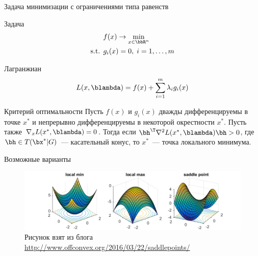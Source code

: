 \documentclass[12pt]{beamer}
\begin{document}
\begin{frame}{{\small Задача минимизации с ограничениями типа равенств}}

\begin{block}{Задача}
\vspace{-3mm}
\begin{equation*}
\begin{split}
& f(x) \rightarrow \min\limits_{x \in \bbR^n} \\
\text{s.t. } & g_i(x) = 0, \; i = 1,\ldots, m 
\end{split}
\end{equation*}
\end{block}

\begin{block}{Лагранжиан}
\vspace{-2mm}
\begin{equation*}
L(x, \blambda) = f(x) + \sum\limits_{i=1}^m\lambda_i g_i(x)
\end{equation*}
\end{block}

\begin{block}{Критерий оптимальности}
Пусть $f(x)$ и $g_i(x)$ дважды дифференцируемы в точке $x^*$ и непрерывно дифференцируемы в некоторой окрестности $x^*$.
Пусть также $\nabla_x L(x^*, \blambda) = 0$.
Тогда если $\bh^{\T}\nabla^2 L(x^*, \blambda)\bh > 0$, где $\bh \in T(\bx^*|G)$~--- касательный конус, то $x^*$~--- точка локального минимума.
\end{block}

\end{frame}

\begin{frame}{Возможные варианты}
\begin{figure}
\centering
\includegraphics[scale=0.5]{minmaxsaddle.png}
\caption{Рисунок взят из блога \url{http://www.offconvex.org/2016/03/22/saddlepoints/}}
\end{figure}
\end{frame}

\end{document}
